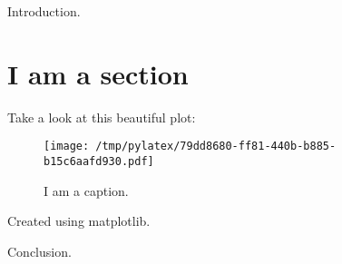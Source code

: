 \documentclass{article}%
\begin{document}
%
\normalsize%
Introduction.%
\section{I am a section}%
Take a look at this beautiful plot:%


\begin{figure}[htbp]%
\centering%
\texttt{[image: /tmp/pylatex/79dd8680-ff81-440b-b885-b15c6aafd930.pdf]}%
\caption{I am a caption.}%
\end{figure}

%
Created using matplotlib.

%
Conclusion.%
\end{document}
